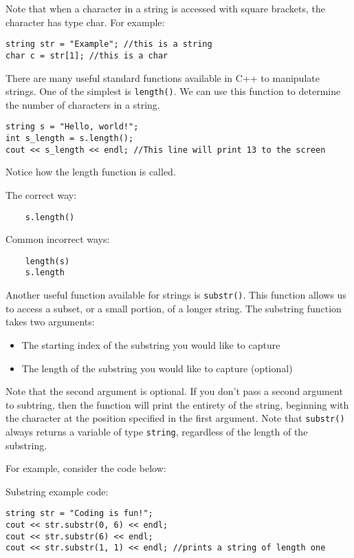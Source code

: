 Note that when a character in a string is accessed with square brackets, the character has type char. For example:

\begin{verbatim}
string str = "Example"; //this is a string
char c = str[1]; //this is a char
\end{verbatim}

There are many useful standard functions available in C++ to manipulate strings. One of the simplest is \texttt{length()}. We can use this function to determine the number of characters in a string. 

\begin{verbatim}
string s = "Hello, world!";
int s_length = s.length();
cout << s_length << endl; //This line will print 13 to the screen    
\end{verbatim}

Notice how the length function is called.

The correct way:

\begin{verbatim}
    s.length()
\end{verbatim}

Common incorrect ways:

\begin{verbatim}
    length(s)
    s.length 
\end{verbatim}

Another useful function available for strings is \texttt{substr()}. This function allows us to access a subset, or a small portion, of a longer string. The substring function takes two arguments:

\begin{itemize}
    \item The starting index of the substring you would like to capture
    \item The length of the substring you would like to capture (optional)
\end{itemize}

Note that the second argument is optional. If you don't pass a second argument to subtring, then the function will print the entirety of the string, beginning with the character at the position specified in the first argument. Note that \texttt{substr()} always returns a variable of type \texttt{string}, regardless of the length of the substring.

For example, consider the code below:

\begin{example}
    Substring example code:

\begin{verbatim}
string str = "Coding is fun!";
cout << str.substr(0, 6) << endl;
cout << str.substr(6) << endl;
cout << str.substr(1, 1) << endl; //prints a string of length one
\end{verbatim}
\end{example}


